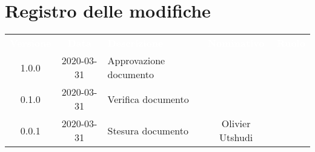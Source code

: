 \section*{Registro delle modifiche}
{
	\centering
	\begin{longtable}{ c c  C{4cm}  c  c }
		\textcolor{white}{\textbf{Versione}} & \textcolor{white}{\textbf{Data}} & \textcolor{white}{\textbf{Descrizione}} & \textcolor{white}{\textbf{Nominativo}} & \textcolor{white}{\textbf{Ruolo}}\\		
		1.0.0 & 2020-03-31 & Approvazione documento &  &\RdP{}\\		
		0.1.0 & 2020-03-31 & Verifica documento &  &\ver{}\\		
		0.0.1 & 2020-03-31 & Stesura documento & Olivier Utshudi &\reda{}\\		
		
	\end{longtable}

}